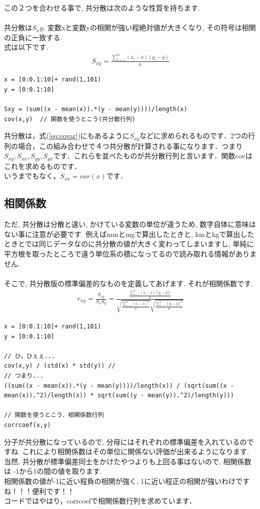 \documentclass[11pt,a4paper]{jreport}
\begin{document}
この２つを合わせる事で, 共分散は次のような性質を持ちます.\\
\\
共分散は$S_xy$, 変数xと変数yの相関が強い程絶対値が大きくなり, その符号は相関の正負に一致する.
\\
式は以下です.\\
\begin{eqnarray}
\label{eq:covar}
S_{xy} = \frac{\sum_{i=1}^{n} (x_i - \bar{x})(y_i - \bar{y})}{n}
\end{eqnarray}

\begin{lstlisting}[caption=共分散のコード,label=sc:scatter keepspaces=true，]
x = [0:0.1:10]+ rand(1,101)
y = [0:0.1:10]

Sxy = (sum((x - mean(x)).*(y - mean(y))))/length(x)
cov(x,y)  // 関数を使うとこう(共分散行列)
\end{lstlisting}
共分散は，式(\ref{eq:covar})にもあるように$S_{xy}$などに求められるものです．2つの行列の場合，この組み合わせで４つ共分散が計算される事になります．つまり$S_{xy}, S_{xx}, S_{yy}, S_{yx}$です．これらを並べたものが共分散行列と言います．関数covはこれを求めるものです．\\
いうまでもなく，$S_{xx} = var(x)$です．

\subsection{相関係数}
ただ, 共分散は分散と違い, かけている変数の単位が違うため, 数字自体に意味はない事に注意が必要です. 例えばmmとmgで算出したときと, kmとkgで算出したときとでは同じデータなのに共分散の値が大きく変わってしまいますし, 単純に平方根を取ったところで違う単位系の積になってるので読み取れる情報がありません.\\
\\
そこで, 共分散版の標準偏差的なものを定義してあげます. それが相関係数です.\\

\begin{eqnarray}
r_{xy} = \frac{S_{xy}}{S_x S_y} = \frac{\frac{\sum_{i=1}^{n} (x_i - \bar{x})(y_i - \bar{y})}{n}}{\sqrt{\frac{\sum_{i=1}^{n} (x_i - \bar{x})^2}{n}} \sqrt{\frac{\sum_{i=1}^{n} (y_i - \bar{y})^2}{n}}}
\end{eqnarray}

\begin{lstlisting}[caption=単回帰のコード,label=sc:scatter]
x = [0:0.1:10]+ rand(1,101)
y = [0:0.1:10]

// ひ，ひぇぇ...
cov(x,y) / (std(x) * std(y)) // 
// つまり...
((sum((x - mean(x)).*(y - mean(y))))/length(x)) / (sqrt(sum((x - mean(x)).^2)/length(x)) * sqrt(sum((y - mean(y)).^2)/length(y)))

// 関数を使うとこう．相関係数行列
corrcoef(x,y)
\end{lstlisting}

分子が共分散になっているので, 分母にはそれぞれの標準偏差を入れているのですね. これにより相関係数はその単位に関係ない評価が出来るようになります. 当然, 共分散が標準偏差同士をかけたやつよりも上回る事はないので, 相関係数は -1から1の間の値を取ります.\\
相関係数の値が-1に近い程負の相関が強く, 1に近い程正の相関が強いわけですね！！！便利です！！\\
コードではやはり，corrcoefで相関係数行列を求めています．
\end{document}
